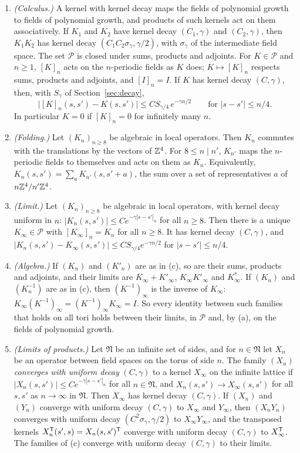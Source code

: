 \begin{lemma}\label{lem:ol-folding}
\begin{enumerate}[label=(\alph*)]
\item \emph{(Calculus.)} A kernel with kernel decay maps the fields of polynomial growth to fields of polynomial growth, and products of such kernels act on them associatively. If $K_1$ and $K_2$ have kernel decay $(C_1,\gamma)$ and $(C_2,\gamma)$, then $K_1K_2$ has kernel decay $(C_1C_2\sigma_\gamma,\gamma/2)$, with $\sigma_\gamma$ of the intermediate field space. The set $\mathscr P$ is closed under sums, products and adjoints. For $K\in\mathscr P$ and $n\ge1$, $[K]_n$ acts on the $n$-periodic fields as $K$ does; $K\mapsto[K]_n$ respects sums, products and adjoints, and $[I]_n=I$. If $K$ has kernel decay $(C,\gamma)$, then, with $S_\gamma$ of Section~\ref{sec:decay},
\[
\big|[K]_n(s,s')-K(s,s')\big|\le CS_{\gamma/4}\,e^{-\gamma n/2}\qquad\text{for }|s-s'|\le n/4 .
\]
In particular $K=0$ if $[K]_n=0$ for infinitely many $n$.
\item \emph{(Folding.)} Let $(K_n)_{n\ge8}$ be algebraic in local operators. Then $K_n$ commutes with the translations by the vectors of $\mathbb Z^4$. For $8\le n\mid n'$, $K_{n'}$ maps the $n$-periodic fields to themselves and acts on them as $K_n$. Equivalently, $K_n(s,s')=\sum_aK_{n'}(s,s'+a)$, the sum over a set of representatives $a$ of $n\mathbb Z^4/n'\mathbb Z^4$.
\item \emph{(Limit.)} Let $(K_n)_{n\ge8}$ be algebraic in local operators, with kernel decay uniform in $n$: $|K_n(s,s')|\le Ce^{-\gamma|s-s'|_n}$ for all $n\ge8$. Then there is a unique $K_\infty\in\mathscr P$ with $[K_\infty]_n=K_n$ for all $n\ge8$. It has kernel decay $(C,\gamma)$, and $|K_n(s,s')-K_\infty(s,s')|\le CS_{\gamma/4}e^{-\gamma n/2}$ for $|s-s'|\le n/4$.
\item \emph{(Algebra.)} If $(K_n)$ and $(K'_n)$ are as in (c), so are their sums, products and adjoints, and their limits are $K_\infty+K'_\infty$, $K_\infty K'_\infty$ and $K_\infty^*$. If $(K_n)$ and $(K_n^{-1})$ are as in (c), then $(K^{-1})_\infty$ is the inverse of $K_\infty$: $K_\infty(K^{-1})_\infty=(K^{-1})_\infty K_\infty=I$. So every identity between such families that holds on all tori holds between their limits, in $\mathscr P$ and, by (a), on the fields of polynomial growth.
\item \emph{(Limits of products.)} Let $\mathfrak N$ be an infinite set of sides, and for $n\in\mathfrak N$ let $X_n$ be an operator between field spaces on the torus of side $n$. The family $(X_n)$ \emph{converges with uniform decay} $(C,\gamma)$ to a kernel $X_\infty$ on the infinite lattice if $|X_n(s,s')|\le Ce^{-\gamma|s-s'|_n}$ for all $n\in\mathfrak N$, and $X_n(s,s')\to X_\infty(s,s')$ for all $s,s'$ as $n\to\infty$ in $\mathfrak N$. Then $X_\infty$ has kernel decay $(C,\gamma)$. If $(X_n)$ and $(Y_n)$ converge with uniform decay $(C,\gamma)$ to $X_\infty$ and $Y_\infty$, then $(X_nY_n)$ converges with uniform decay $(C^2\sigma_\gamma,\gamma/2)$ to $X_\infty Y_\infty$, and the transposed kernels $X_n^{\sf T}(s',s)=X_n(s,s')^{\sf T}$ converge with uniform decay $(C,\gamma)$ to $X_\infty^{\sf T}$. The families of (c) converge with uniform decay $(C,\gamma)$ to their limits.

\end{enumerate}
\end{lemma}
